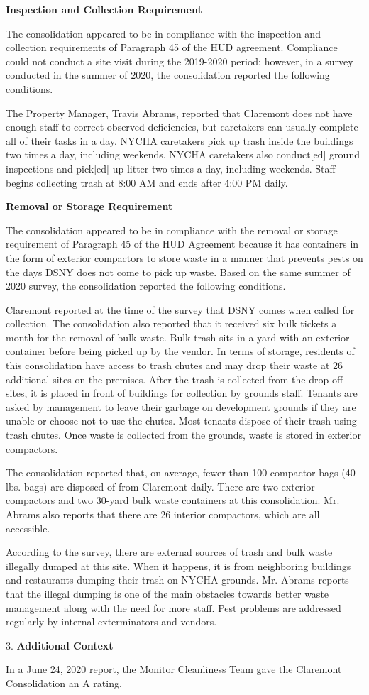 

\textbf{Inspection and Collection Requirement}

The consolidation appeared to be in compliance with the inspection and collection requirements of Paragraph 45 of the HUD agreement. Compliance could not conduct a site visit during the 2019-2020 period; however, in a survey conducted in the summer of 2020, the consolidation reported the following conditions.

The Property Manager, Travis Abrams, reported that Claremont does not have enough staff to correct observed deficiencies, but caretakers can usually complete all of their tasks in a day. NYCHA caretakers pick up trash inside the buildings two times a day, including weekends. NYCHA caretakers also conduct[ed] ground inspections and pick[ed] up litter two times a day, including weekends. Staff begins collecting trash at 8:00 AM and ends after 4:00 PM daily. 

\textbf{Removal or Storage Requirement}

The consolidation appeared to be in compliance with the  removal or storage requirement of Paragraph  45 of the HUD Agreement because it has containers in the form of exterior compactors to store waste in a manner that prevents pests on the days DSNY does not come to pick up waste. Based on the same summer of  2020 survey, the consolidation reported the following conditions.

Claremont reported at the time of the survey that DSNY comes when called for collection. The consolidation also reported that it received six bulk tickets a month for the removal of bulk waste. Bulk trash sits in a yard with an exterior container before being picked up by the vendor. In terms of storage, residents of this consolidation have access to trash chutes and may drop their waste at 26 additional sites on the premises. After the trash is collected from the drop-off sites, it is placed in front of buildings for collection by grounds staff. Tenants are asked by management to leave their garbage on development grounds if they are unable or choose not to use the chutes. Most tenants dispose of their trash using trash chutes. Once waste is collected from the grounds, waste is stored in exterior compactors. 

The consolidation reported that, on average, fewer than 100 compactor bags (40 lbs. bags) are disposed of from Claremont daily. There are two exterior compactors and two 30-yard bulk waste containers at this consolidation. Mr. Abrams also reports that there are 26 interior compactors, which are all accessible.

According to the survey, there are external sources of trash and bulk waste illegally dumped at this site. When it happens, it is from neighboring buildings and restaurants dumping their trash on NYCHA grounds. Mr. Abrams reports that the illegal dumping is one of the main obstacles towards better waste management along with the need for more staff. Pest problems are addressed regularly by internal exterminators and vendors.

3. \textbf{Additional Context} 

In a June 24, 2020 report, the Monitor Cleanliness Team gave the Claremont Consolidation an A rating. 
